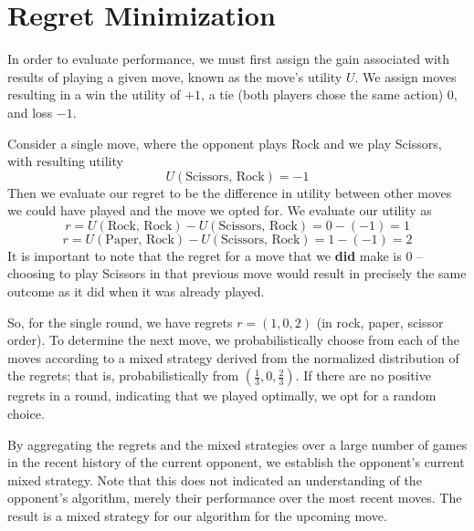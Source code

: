 
\section{Regret Minimization}
\label{sec:background}

In order to evaluate performance, we must first assign the gain associated with results of playing a given move, known as the move's utility $U$.  We assign moves resulting in a win the utility of $+1$, a tie (both players chose the same action) $0$, and loss $-1$.

Consider a single move, where the opponent plays Rock and we play Scissors, with resulting utility 
$$U(\textrm{Scissors, Rock}) = -1$$  
Then we evaluate our regret to be the difference in utility between other moves we could have played and the move we opted for.  We evaluate our utility as
$$ r = U(\textrm{Rock, Rock}) - U(\textrm{Scissors, Rock}) = 0 - (-1) = 1$$
$$ r = U(\textrm{Paper, Rock}) - U(\textrm{Scissors, Rock}) = 1 - ( -1) = 2$$
It is important to note that the regret for a move that we \textbf{did} make is 0 -- choosing to play Scissors in that previous move would result in precisely the same outcome as it did when it was already played.  

So, for the single round, we have regrets $r = (1, 0, 2)$ (in rock, paper, scissor order).  To determine the next move, we probabilistically choose from each of the moves according to a mixed strategy derived from the normalized distribution of the regrets; that is, probabilistically from $(\frac{1}{3}, 0, \frac{2}{3})$.  If there are no positive regrets in a round, indicating that we played optimally, we opt for a random choice.

By aggregating the regrets and the mixed strategies over a large number of games in the recent history of the current opponent, we establish the opponent's current mixed strategy.  Note that this does not indicated an understanding of the opponent's algorithm, merely their performance over the most recent moves.  The result is a mixed strategy for our algorithm for the upcoming move.